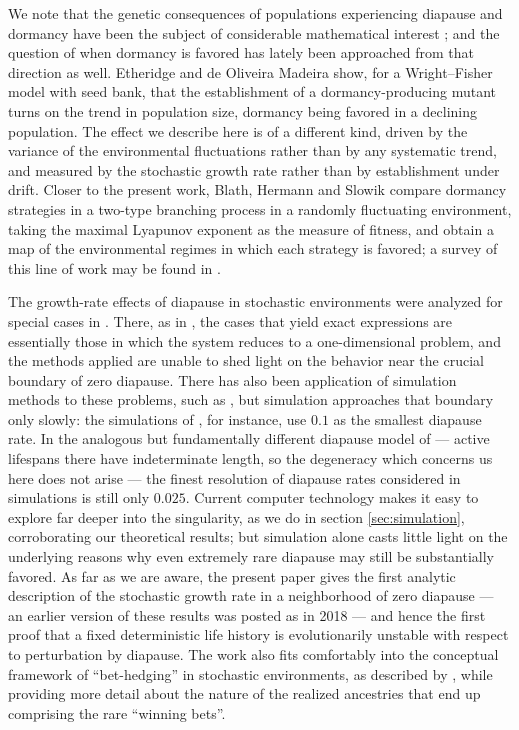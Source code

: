 \documentclass[11pt]{amsart}
\begin{document}
We note that the genetic consequences of populations experiencing diapause and
dormancy have been the subject of considerable mathematical interest
\cite{shoemaker2018seedbank,blath2016seedbank,heinrich2018effects,lennon2021principles};
and the question of when dormancy is favored has lately been approached from that
direction as well. Etheridge and de Oliveira Madeira \cite{EM26} show, for a
Wright--Fisher model with seed bank, that the establishment of a dormancy-producing
mutant turns on the trend in population size, dormancy being favored in a declining
population. The effect we describe here is of a different kind, driven by the
variance of the environmental fluctuations rather than by any systematic trend, and
measured by the stochastic growth rate rather than by establishment under drift.
Closer to the present work, Blath, Hermann and Slowik \cite{BHS21} compare dormancy
strategies in a two-type branching process in a randomly fluctuating environment,
taking the maximal Lyapunov exponent as the measure of fitness, and obtain a map of
the environmental regimes in which each strategy is favored; a survey of this line
of work may be found in \cite{blath2024dormancy}.

The growth-rate effects of diapause in stochastic environments were analyzed for
special cases in \cite{TI93}. There, as in \cite{BHS21}, the cases that yield exact
expressions are essentially those in which the system reduces to a one-dimensional
problem, and the methods applied are unable to shed light on the behavior near the
crucial boundary of zero diapause.
There has also been application of simulation methods to these problems, such as
\cite{EE00,menu2000bet}, but simulation approaches that boundary only slowly: the
simulations of \cite{menu2000bet}, for instance, use $0.1$ as the smallest diapause
rate.
In the analogous but fundamentally different diapause model of \cite{magalie2023optimal} --- active lifespans there have indeterminate length, so the degeneracy which concerns us here does not arise --- the finest resolution of  diapause rates considered in simulations is still only $0.025$.
Current computer technology makes it easy to explore far deeper into the
singularity, as we do in section \ref{sec:simulation}, corroborating our theoretical
results; but simulation alone casts little light on the underlying reasons why even
extremely rare diapause may still be substantially favored.
As far as we are aware, the present paper gives the first analytic description of the
stochastic growth rate in a neighborhood of zero diapause --- an earlier version of these results was posted as \cite{diapause2018} in 2018 --- and hence the first proof
that a fixed deterministic life history is evolutionarily unstable with respect to
perturbation by diapause.
The work also fits comfortably into the conceptual framework of ``bet-hedging'' in
stochastic environments, as described by \cite{menu2000bet}, while providing more
detail about the nature of the realized ancestries that end up comprising the rare
``winning bets''.
\end{document}
